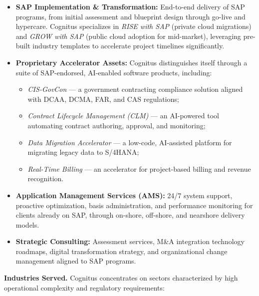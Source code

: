 \begin{itemize}
    \item \textbf{SAP Implementation \& Transformation:} End-to-end delivery of SAP programs, from initial assessment and blueprint design through go-live and hypercare. Cognitus specializes in \textit{RISE with SAP} (private cloud migrations) and \textit{GROW with SAP} (public cloud adoption for mid-market), leveraging pre-built industry templates to accelerate project timelines significantly.

    \item \textbf{Proprietary Accelerator Assets:} Cognitus distinguishes itself through a suite of SAP-endorsed, AI-enabled software products, including:
    \begin{itemize}
        \item \textit{CIS-GovCon} --- a government contracting compliance solution aligned with DCAA, DCMA, FAR, and CAS regulations;
        \item \textit{Contract Lifecycle Management (CLM)} --- an AI-powered tool automating contract authoring, approval, and monitoring;
        \item \textit{Data Migration Accelerator} --- a low-code, AI-assisted platform for migrating legacy data to S/4HANA;
        \item \textit{Real-Time Billing} --- an accelerator for project-based billing and revenue recognition.
    \end{itemize}

    \item \textbf{Application Management Services (AMS):} 24/7 system support, proactive optimization, basis administration, and performance monitoring for clients already on SAP, through on-shore, off-shore, and nearshore delivery models.

    \item \textbf{Strategic Consulting:} Assessment services, M\&A integration technology roadmaps, digital transformation strategy, and organizational change management aligned to SAP programs.
\end{itemize}

\textbf{Industries Served.}
Cognitus concentrates on sectors characterized by high operational complexity and regulatory requirements:

